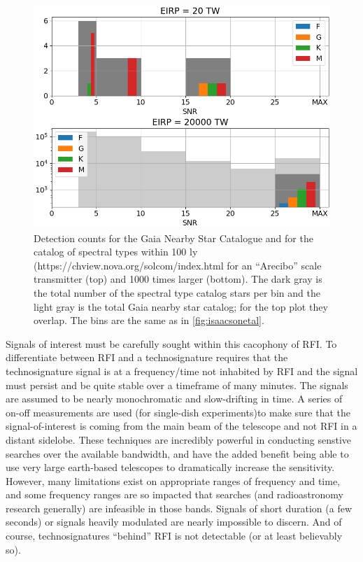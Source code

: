 \begin{figure}
    \centering
    \includegraphics[width=0.75\linewidth]{figures/gaia_100lycounts.png}
    \caption{Detection counts for the Gaia Nearby Star Catalogue \citep{2021A&A...649A...6G} and for the catalog of spectral types within 100 ly (https://chview.nova.org/solcom/index.html for an ``Arecibo'' scale transmitter (top) and 1000 times larger (bottom).  The dark gray is the total number of the spectral type catalog stars per bin and the light gray is the total Gaia nearby star catalog; for the top plot they overlap.  The bins are the same as in \ref{fig:isaacsonetal}.}
    \label{fig:gaia100ly}
\end{figure}

Signals of interest must be carefully sought within this cacophony of RFI. To differentiate between RFI and a technosignature requires that the technosignature signal is at a frequency/time not inhabited by RFI and the signal must persist and be quite stable over a timeframe of many minutes.  The signals are assumed to be nearly monochromatic and slow-drifting in time.  A series of on-off measurements are used (for single-dish experiments)to make sure that the signal-of-interest is coming from the main beam of the telescope and not RFI in a distant sidelobe.  These techniques are incredibly powerful in conducting senstive searches over the available bandwidth, and have the added benefit being able to use very large earth-based telescopes to dramatically increase the sensitivity.  However, many limitations exist on appropriate ranges of frequency and time, and some frequency ranges are so impacted that searches (and radioastronomy research generally) are infeasible in those bands.  Signals of short duration (a few seconds) or signals heavily modulated are nearly impossible to discern.  And of course, technosignatures ``behind'' RFI is not detectable (or at least believably so).


